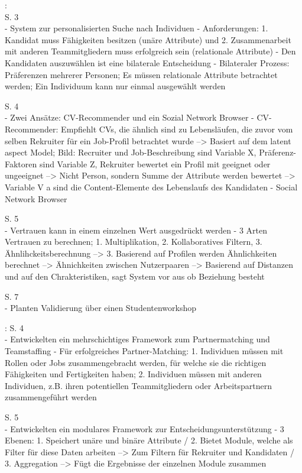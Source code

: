 \newpage
\textcite{keim:2005}:\\
S. 3\\
- System zur personalisierten Suche nach Individuen
- Anforderungen: 1. Kandidat muss Fähigkeiten besitzen (unäre Attribute) und 2. Zusammenarbeit mit anderen Teammitgliedern muss erfolgreich sein (relationale Attribute)
- Den Kandidaten auszuwählen ist eine bilaterale Entscheidung
- Bilateraler Prozess: Präferenzen mehrerer Personen; Es müssen relationale Attribute betrachtet werden; Ein Individuum kann nur einmal ausgewählt werden

S. 4\\
- Zwei Ansätze: CV-Recommender und ein Sozial Network Browser
- CV-Recommender: Empfiehlt CVs, die ähnlich sind zu Lebensläufen, die zuvor vom selben Rekruiter für ein Job-Profil betrachtet wurde --> Basiert auf dem latent aspect Model; Bild: Recruiter und Job-Beschreibung sind Variable X, Präferenz-Faktoren sind Variable Z, Rekruiter bewertet ein Profil mit geeignet oder ungeeignet --> Nicht Person, sondern Summe der Attribute werden bewertet --> Variable V a sind die Content-Elemente des Lebenslaufs des Kandidaten
- Social Network Browser

S. 5\\
- Vertrauen kann in einem einzelnen Wert ausgedrückt werden
- 3 Arten Vertrauen zu berechnen; 1. Multiplikation, 2. Kollaboratives Filtern, 3. Ähnlihckeitsberechnung --> 3. Basierend auf Profilen werden Ähnlichkeiten berechnet --> Ähnichkeiten zwischen Nutzerpaaren --> Basierend auf Distanzen und auf den Chrakteristiken, sagt System vor aus ob Beziehung besteht

S. 7\\
- Planten Validierung über einen Studentenworkshop

\textcite{keim:2007}:
S. 4\\
- Entwickelten ein mehrschichtiges Framework zum Partnermatching und Teamstaffing
- Für erfolgreiches Partner-Matching: 1. Individuen müssen mit Rollen oder Jobs zusammengebracht werden, für welche sie die richtigen Fähigkeiten und Fertigkeiten haben; 2. Individuen müssen mit anderen Individuen, z.B. ihren potentiellen Teammitgliedern oder Arbeitspartnern zusammengeführt werden

S. 5\\
- Entwickelten ein modulares Framework zur Entscheidungsunterstützung
- 3 Ebenen: 1. Speichert unäre und binäre Attribute / 2. Bietet Module, welche als Filter für diese Daten arbeiten --> Zum Filtern für Rekruiter und Kandidaten / 3. Aggregation --> Fügt die Ergebnisse der einzelnen Module zusammen

